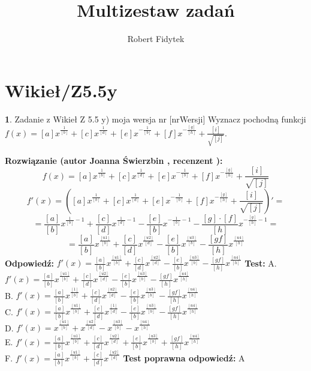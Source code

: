 \documentclass[12pt, a4paper]{article}
\title{Multizestaw zadań}
\author{Robert Fidytek}
\date{}
\theoremstyle{definition} %
\newtheorem{zad}{}
\newcommand{\kategoria}[1]{\section{#1}} %
\newcommand{\zadStart}[1]{\begin{zad}#1\newline} %
\newcommand{\zadStop}{\end{zad}}   %
\newcommand{\rozwStart}[2]{\noindent \textbf{Rozwiązanie (autor #1 , recenzent #2): }\newline} %
\newcommand{\rozwStop}{\newline}                                            %
\newcommand{\odpStart}{\noindent \textbf{Odpowiedź:}\newline}    %
\newcommand{\odpStop}{\newline}                                             %
\newcommand{\testStart}{\noindent \textbf{Test:}\newline} %
\newcommand{\testStop}{\newline} %
\newcommand{\kluczStart}{\noindent \textbf{Test poprawna odpowiedź:}\newline} %
\newcommand{\kluczStop}{\newline} %
\begin{document}
\maketitle


\kategoria{Wikieł/Z5.5y}
\zadStart{Zadanie z Wikieł Z 5.5 y) moja wersja nr [nrWersji]}
Wyznacz pochodną funkcji \\ $f(x)=[a]x^{\frac{1}{[b]}}+[c]x^{\frac{1}{[d]}}+[e]x^{-\frac{1}{[b]}}+[f]x^{-\frac{[g]}{[h]}}+\frac{[i]}{\sqrt{[j]}} $.
\zadStop
\rozwStart{Joanna Świerzbin}{}
$$ f(x)=[a]x^{\frac{1}{[b]}}+[c]x^{\frac{1}{[d]}}+[e]x^{-\frac{1}{[b]}}+[f]x^{-\frac{[g]}{[h]}}+\frac{[i]}{\sqrt{[j]}}  $$
$$ f'(x)=\left([a]x^{\frac{1}{[b]}}+[c]x^{\frac{1}{[d]}}+[e]x^{-\frac{1}{[b]}}+[f]x^{-\frac{[g]}{[h]}}+\frac{[i]}{\sqrt{[j]}}\right)' =  $$
$$ =\frac{[a]}{[b]}x^{\frac{1}{[b]}-1}+\frac{[c]}{[d]}x^{\frac{1}{[d]}-1}-\frac{[e]}{[b]}x^{-\frac{1}{[b]}-1}-\frac{[g]\cdot[f]}{[h]}x^{-\frac{[g]}{[h]}-1} =  $$
$$ =\frac{[a]}{[b]}x^{\frac{[u1]}{[b]}}+\frac{[c]}{[d]}x^{\frac{[u2]}{[d]}}-\frac{[e]}{[b]}x^{\frac{[u3]}{[b]}}-\frac{[gf]}{[h]}x^{\frac{[u4]}{[h]}} $$
\rozwStop
\odpStart
$ f'(x)  =\frac{[a]}{[b]}x^{\frac{[u1]}{[b]}}+\frac{[c]}{[d]}x^{\frac{[u2]}{[d]}}-\frac{[e]}{[b]}x^{\frac{[u3]}{[b]}}-\frac{[gf]}{[h]}x^{\frac{[u4]}{[h]}} $
\odpStop
\testStart
A. $ f'(x)  =\frac{[a]}{[b]}x^{\frac{[u1]}{[b]}}+\frac{[c]}{[d]}x^{\frac{[u2]}{[d]}}-\frac{[e]}{[b]}x^{\frac{[u3]}{[b]}}-\frac{[gf]}{[h]}x^{\frac{[u4]}{[h]}} $\\
B. $ f'(x)  =\frac{[a]}{[b]}x^{\frac{[1]}{[b]}}+\frac{[c]}{[d]}x^{\frac{[u2]}{[d]}}-\frac{[e]}{[b]}x^{\frac{[u3]}{[b]}}-\frac{[gf]}{[h]}x^{\frac{[u4]}{[h]}} $\\
C. $ f'(x)  =\frac{[a]}{[b]}x^{\frac{[u1]}{[b]}}+\frac{[c]}{[d]}x^{\frac{[1]}{[d]}}-\frac{[e]}{[b]}x^{\frac{[u3]}{[b]}}-\frac{[gf]}{[h]}x^{\frac{[u4]}{[h]}} $\\
D. $ f'(x)  =x^{\frac{[u1]}{[b]}}+x^{\frac{[u2]}{[d]}}-x^{\frac{[u3]}{[b]}}-x^{\frac{[u4]}{[h]}} $\\
E. $ f'(x) =\frac{[a]}{[b]}x^{\frac{[u1]}{[b]}}+\frac{[c]}{[d]}x^{\frac{[u2]}{[d]}}+\frac{[e]}{[b]}x^{\frac{[u3]}{[b]}}+\frac{[gf]}{[h]}x^{\frac{[u4]}{[h]}} $\\
F. $ f'(x)  =\frac{[a]}{[b]}x^{\frac{[u1]}{[b]}}+\frac{[c]}{[d]}x^{\frac{[u2]}{[d]}} $
\testStop
\kluczStart
A
\kluczStop
\end{document}
